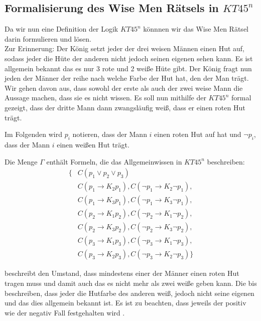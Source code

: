 \subsection{Formalisierung des Wise Men Rätsels in $KT45^n$}
Da wir nun eine Definition der Logik $KT45^n$ könnnen wir das Wise Men Rätsel darin formulieren und lösen.\\
Zur Erinnerung: Der König setzt jeder der drei weisen Männen einen Hut auf, sodass jeder die Hüte der anderen nicht jedoch seinen eigenen sehen kann.
Es ist allgemein bekannt das es nur 3 rote und 2 weiße Hüte gibt.
Der König fragt nun jeden der Männer der reihe nach welche Farbe der Hut hat, den der Man trägt.
Wir gehen davon aus, dass sowohl der erste als auch der zwei weise Mann die Aussage machen, dass sie es nicht wissen.
Es soll nun mithilfe der $KT45^n$ formal gezeigt, dass der dritte Mann dann zwangsläufig weiß, dass er einen roten Hut trägt.

Im Folgenden wird $p_i$ notieren, dass der Mann $i$ einen roten Hut auf hat und 
$\neg p_i$, dass der Mann $i$ einen weißen Hut trägt.

Die Menge $\Gamma$ enthält Formeln, die das Allgemeinwissen in $KT45^n$ beschreiben:
\begin{subequations}
	\begin{align}
		\{&C(p_1 \vee p_2 \vee p_3) \label{eq:min_ein_roter_hut}\\
		\label{eq:zweiter_kennt_farbe_von_erster}
		&C(p_1 \rightarrow K_2 p_1), C(\neg p_1 \rightarrow K_2 \neg p_1),\\
		&C(p_1 \rightarrow K_3 p_1), C(\neg p_1 \rightarrow K_3 \neg p_1),\\
		&C(p_2 \rightarrow K_1 p_2), C(\neg p_2 \rightarrow K_1 \neg p_2),\\
		&C(p_2 \rightarrow K_3 p_2), C(\neg p_2 \rightarrow K_3 \neg p_2),\\
		&C(p_3 \rightarrow K_1 p_3), C(\neg p_3 \rightarrow K_1 \neg p_3),\\
		\label{eq:zweiter_kennt_farbe_von_letzter}
		&C(p_3 \rightarrow K_2 p_3), C(\neg p_3 \rightarrow K_2 \neg p_3)\}
	\end{align}
\end{subequations}

 beschreibt den Umstand, dass mindestens einer der Männer einen roten Hut tragen muss und damit auch das es nicht mehr als zwei weiße geben kann.
Die  bis  beschreiben, dass jeder die Hutfarbe des anderen weiß, jedoch nicht seine eigenen und das dies allgemein bekannt ist.
Es ist zu beachten, dass jeweils der positiv wie der negativ Fall festgehalten wird .


